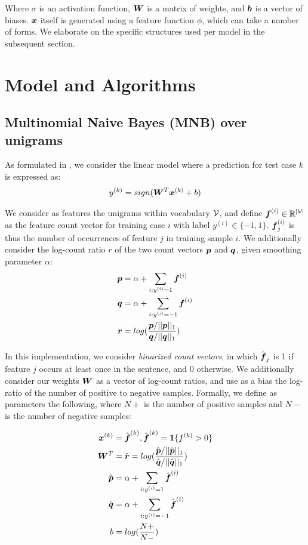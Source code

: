 \documentclass[11pt]{article}
\begin{document}
Where $\sigma$ is an activation function, $\boldsymbol{W}$ is a matrix of weights, and $\boldsymbol{b}$ is a vector of biases. $\boldsymbol{x}$ itself is generated using a feature function $\phi$, which can take a number of forms. We elaborate on the specific structures used per model in the subsequent section.

\section{Model and Algorithms}

\subsection{Multinomial Naive Bayes (MNB) over unigrams}

As formulated in \cite{wang2012baselines}, we consider the linear model where a prediction for test case $k$ is expressed as:
\begin{align}
  y^{(k)} = sign(\boldsymbol{W}^{T}\boldsymbol{x}^{(k)} + b)
\end{align}

We consider as features the unigrams within vocabulary $\mathcal{V}$, and define $\boldsymbol{f}^{(i)} \in \mathbb{R}^{|\mathcal{V}|}$ as the feature count vector for training case $i$ with label $y^{(i)} \in \{-1, 1\}$. $\boldsymbol{f}^{(i)}_j$ is thus the number of occurrences of feature $j$ in training sample $i$. We additionally consider the log-count ratio $r$ of the two count vectors $\boldsymbol{p}$ and $\boldsymbol{q}$, given smoothing parameter $\alpha$:
\begin{align}
  \boldsymbol{p} &= \alpha + \sum_{i:y^{(i)}=1}{\boldsymbol{f}^{(i)}} \\
  \boldsymbol{q} &= \alpha + \sum_{i:y^{(i)}=-1}{\boldsymbol{f}^{(i)}} \\
  \boldsymbol{r} &= log(\frac{\boldsymbol{p} / ||\boldsymbol{p}||_1}{\boldsymbol{q} / ||\boldsymbol{q}||_1})
\end{align}

In this implementation, we consider \textit{binarized count vectors}, in which $\hat{\boldsymbol{f}}_j$ is 1 if feature $j$ occurs at least once in the sentence, and 0 otherwise. We additionally consider our weights $\boldsymbol{W}$ as a vector of log-count ratios, and use as a bias the log-ratio of the number of positive to negative samples. Formally, we define as parameters the following, where $N+$ is the number of positive samples and $N-$ is the number of negative samples:

\begin{align}
  \boldsymbol{x}^{(k)} &= \hat{\boldsymbol{f}}^{(k)}, \hat{\boldsymbol{f}}^{(k)} = \textbf{1}\{f^{(k)} > 0\} \\
  \boldsymbol{W}^T &= \hat{\boldsymbol{r}} = log(\frac{\hat{\boldsymbol{p}} / ||\hat{\boldsymbol{p}}||_1}{\hat{\boldsymbol{q}} / ||\hat{\boldsymbol{q}}||_1}) \\
  \hat{\boldsymbol{p}} &= \alpha + \sum_{i:y^{(i)}=1}{\hat{\boldsymbol{f}}^{(i)}} \\
  \hat{\boldsymbol{q}} &= \alpha + \sum_{i:y^{(i)}=-1}{\hat{\boldsymbol{f}}^{(i)}} \\
  b &= log(\frac{N+}{N-})
\end{align}
\end{document}
